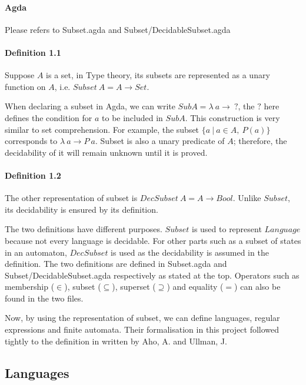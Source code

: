 \documentclass[twoside,openright,final]{bhamthesis}
\begin{document}
\paragraph{Agda} Please refers to Subset.agda and Subset/DecidableSubset.agda

\paragraph{Definition 1.1} Suppose \(A\) is a set, in Type theory, its
subsets are represented as a unary function on
\(A\), i.e. \(Subset\ A = A \to Set\). \\

\par When declaring a subset in Agda, we can write \(SubA =
\lambda\ a \to\ ?\), the \(?\) here defines the
condition for \(a\) to be included in \(SubA\). This construction is
very similar to set comprehension. For example, the subset 
\(\{a\ | \ a \in A,\ P(a)\}\) corresponds to \(\lambda\ a \to P\
a\). Subset is also a unary predicate of \(A\); therefore, the decidability of it will remain
unknown until it is proved. 

\paragraph{Definition 1.2} The other representation of subset is \(DecSubset\ A = A \to
Bool\). Unlike \(Subset\), its decidability is ensured by its
definition. \\

\par The two definitions have different purposes. \(Subset\) is used to represent \(Language\) because not every
language is decidable. For other parts 
such as a subset of states in an automaton, \(DecSubset\) is used
as the decidability is assumed in the definition. The two definitions
are defined in Subset.agda and Subset/DecidableSubset.agda
respectively as stated at the top. Operators such as membership (\(\in\)), subset
(\(\subseteq\)), superset (\(\supseteq\)) and equality (\(=\)) can
also be found in the two files. 

\par Now, by using the representation of subset, we can define languages, regular expressions and finite
automata. Their formalisation in this project followed tightly to the
definition in \cite{aho1972} written by Aho, A. and Ullman, J. 

\subsection{Languages}
\end{document}
